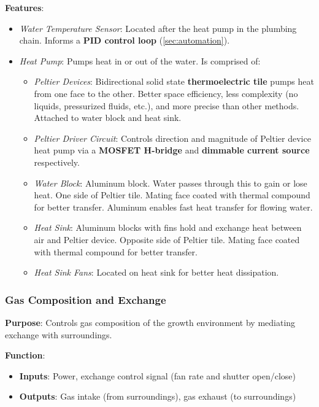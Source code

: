 \documentclass{report}
\begin{document}
\textbf{Features}:
\begin{itemize}
    \item \textit{Water Temperature Sensor}: Located after the heat pump in the plumbing chain. Informs a \textbf{PID control loop} (\ref{sec:automation}).
    \item \textit{Heat Pump}: Pumps heat in or out of the water. Is comprised of:
    \begin{itemize}
        \item \textit{Peltier Devices}: Bidirectional solid state \textbf{thermoelectric tile} pumps heat from one face to the other. Better space efficiency, less complexity (no liquids, pressurized fluids, etc.), and more precise than other methods. Attached to water block and heat sink.
        \item \textit{Peltier Driver Circuit}: Controls direction and magnitude of Peltier device heat pump via a \textbf{MOSFET H-bridge} and \textbf{dimmable current source} respectively.
        \item \textit{Water Block}: Aluminum block. Water passes through this to gain or lose heat. One side of Peltier tile. Mating face coated with thermal compound for better transfer. Aluminum enables fast heat transfer for flowing water.
        \item \textit{Heat Sink}: Aluminum blocks with fins hold and exchange heat between air and Peltier device. Opposite side of Peltier tile. Mating face coated with thermal compound for better transfer.
        \item \textit{Heat Sink Fans}: Located on heat sink for better heat dissipation.
    \end{itemize}
\end{itemize}

\newpage

\subsubsection{Gas Composition and Exchange}
\label{sec:gas}

\textbf{Purpose}: Controls gas composition of the growth environment by mediating exchange with surroundings.

\textbf{Function}:
\begin{itemize}
    \item \textbf{Inputs}: Power, exchange control signal (fan rate and shutter open/close)
    \item \textbf{Outputs}: Gas intake (from surroundings), gas exhaust (to surroundings)
\end{itemize}
\end{document}
